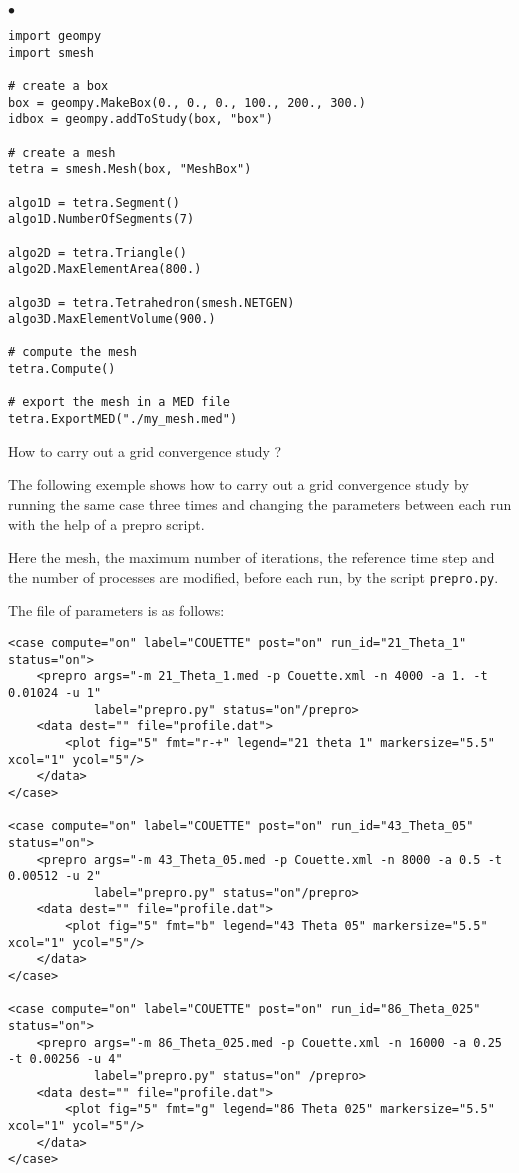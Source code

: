 \documentclass[a4paper,10pt,twoside]{csshortdoc}
\begin{document}
\begin{list}{$\bullet$}{}
\begin{verbatim}
import geompy
import smesh

# create a box
box = geompy.MakeBox(0., 0., 0., 100., 200., 300.)
idbox = geompy.addToStudy(box, "box")

# create a mesh
tetra = smesh.Mesh(box, "MeshBox")

algo1D = tetra.Segment()
algo1D.NumberOfSegments(7)

algo2D = tetra.Triangle()
algo2D.MaxElementArea(800.)

algo3D = tetra.Tetrahedron(smesh.NETGEN)
algo3D.MaxElementVolume(900.)

# compute the mesh
tetra.Compute()

# export the mesh in a MED file
tetra.ExportMED("./my_mesh.med")
\end{verbatim}
\normalsize

\item How to carry out a grid convergence study ?

The following exemple shows how to carry out a grid convergence study by running
the same case three times and changing the parameters between each run with the
help of a prepro script.

Here the mesh, the maximum number of iterations, the reference time step and the
number of processes are modified, before each run, by the script
\texttt{prepro.py}.

The file of parameters is as follows:

\small
\begin{verbatim}
<case compute="on" label="COUETTE" post="on" run_id="21_Theta_1" status="on">
    <prepro args="-m 21_Theta_1.med -p Couette.xml -n 4000 -a 1. -t 0.01024 -u 1"
            label="prepro.py" status="on"/prepro>
    <data dest="" file="profile.dat">
        <plot fig="5" fmt="r-+" legend="21 theta 1" markersize="5.5" xcol="1" ycol="5"/>
    </data>
</case>

<case compute="on" label="COUETTE" post="on" run_id="43_Theta_05" status="on">
    <prepro args="-m 43_Theta_05.med -p Couette.xml -n 8000 -a 0.5 -t 0.00512 -u 2"
            label="prepro.py" status="on"/prepro>
    <data dest="" file="profile.dat">
        <plot fig="5" fmt="b" legend="43 Theta 05" markersize="5.5" xcol="1" ycol="5"/>
    </data>
</case>

<case compute="on" label="COUETTE" post="on" run_id="86_Theta_025" status="on">
    <prepro args="-m 86_Theta_025.med -p Couette.xml -n 16000 -a 0.25 -t 0.00256 -u 4"
            label="prepro.py" status="on" /prepro>
    <data dest="" file="profile.dat">
        <plot fig="5" fmt="g" legend="86 Theta 025" markersize="5.5" xcol="1" ycol="5"/>
    </data>
</case>
\end{verbatim}
\normalsize


\end{list}
\end{document}
